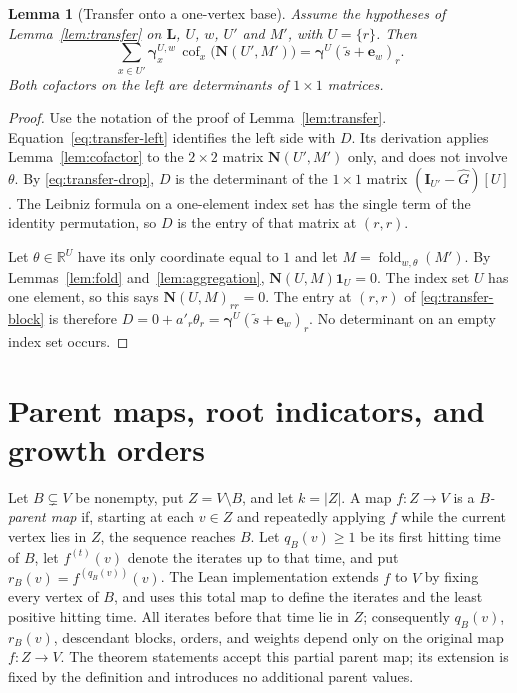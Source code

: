 \documentclass[11pt]{article}
\newtheorem{lemma}[definition]{Lemma}
\newcommand{\R}{\mathbb R}
\newcommand{\one}{\mathbf 1}
\newcommand{\Id}{\mathbf I}
\newcommand{\Lmat}{\mathbf L}
\newcommand{\Nmat}{\mathbf N}
\newcommand{\gam}{\boldsymbol\gamma}
\newcommand{\cof}{\operatorname{cof}}
\begin{document}
\begin{lemma}[Transfer onto a one-vertex base]\label{lem:single-base}
Assume the hypotheses of Lemma~\ref{lem:transfer} on $\Lmat$, $U$,
$w$, $U'$ and $M'$, with $U=\{r\}$. Then
\begin{equation}\label{eq:single-base}
\sum_{x\in U'}\gam^{U,w}_x\,
  \cof_x\bigl(\Nmat(U',M')\bigr)
=\gam^U(\widetilde s+\mathbf e_w)_r .
\end{equation}
Both cofactors on the left are determinants of $1\times1$ matrices.
\end{lemma}
\begin{proof}
Use the notation of the proof of Lemma~\ref{lem:transfer}.
Equation~\eqref{eq:transfer-left} identifies the left side with
$D$. Its derivation applies Lemma~\ref{lem:cofactor} to the
$2\times2$ matrix $\Nmat(U',M')$ only, and does not involve
$\theta$. By \eqref{eq:transfer-drop}, $D$ is the determinant of
the $1\times1$ matrix $(\Id_{U'}-\widehat G)[U]$. The Leibniz
formula on a one-element index set has the single term of the
identity permutation, so $D$ is the entry of that matrix at $(r,r)$.

Let $\theta\in\R^U$ have its only coordinate equal to $1$ and let
$M=\operatorname{fold}_{w,\theta}(M')$. By Lemmas~\ref{lem:fold}
and~\ref{lem:aggregation}, $\Nmat(U,M)\one_U=0$. The index set $U$
has one element, so this says $\Nmat(U,M)_{rr}=0$. The entry at
$(r,r)$ of \eqref{eq:transfer-block} is therefore
$D=0+a'_r\theta_r=\gam^U(\widetilde s+\mathbf e_w)_r$.
No determinant on an empty index set occurs.
\end{proof}

\section{Parent maps, root indicators, and growth orders}

Let $B\subsetneq V$ be nonempty, put $Z=V\setminus B$, and let
$k=|Z|$. A map $f:Z\to V$ is a \emph{$B$-parent map} if, starting at
each $v\in Z$ and repeatedly applying $f$ while the current vertex
lies in $Z$, the sequence reaches $B$. Let $q_B(v)\geq1$ be its
first hitting time of $B$, let $f^{(t)}(v)$ denote the iterates up to
that time, and put $r_B(v)=f^{(q_B(v))}(v)$.
The Lean implementation extends $f$ to $V$ by fixing every vertex
of $B$, and uses this total map to define the iterates and the least
positive hitting time. All iterates before that time lie in $Z$;
consequently $q_B(v)$, $r_B(v)$, descendant blocks, orders, and
weights depend only on the original map $f:Z\to V$. The theorem
statements accept this partial parent map; its extension is fixed by
the definition and introduces no additional parent values.
\end{document}
